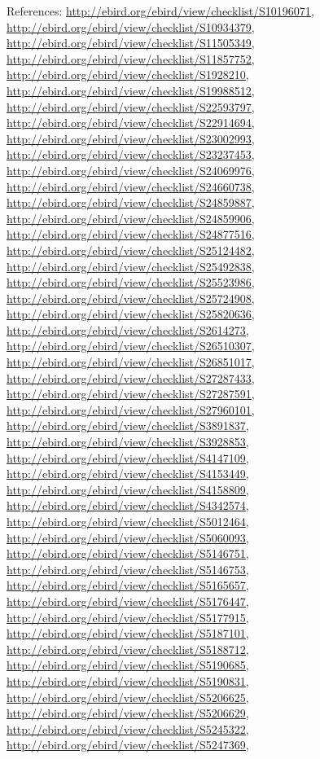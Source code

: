 \documentclass[9pt, article]{memoir}
\begin{document}
\begin{multicols}{2}
References: 
\url{http://ebird.org/ebird/view/checklist/S10196071}, 
\url{http://ebird.org/ebird/view/checklist/S10934379}, 
\url{http://ebird.org/ebird/view/checklist/S11505349}, 
\url{http://ebird.org/ebird/view/checklist/S11857752}, 
\url{http://ebird.org/ebird/view/checklist/S1928210}, 
\url{http://ebird.org/ebird/view/checklist/S19988512}, 
\url{http://ebird.org/ebird/view/checklist/S22593797}, 
\url{http://ebird.org/ebird/view/checklist/S22914694}, 
\url{http://ebird.org/ebird/view/checklist/S23002993}, 
\url{http://ebird.org/ebird/view/checklist/S23237453}, 
\url{http://ebird.org/ebird/view/checklist/S24069976}, 
\url{http://ebird.org/ebird/view/checklist/S24660738}, 
\url{http://ebird.org/ebird/view/checklist/S24859887}, 
\url{http://ebird.org/ebird/view/checklist/S24859906}, 
\url{http://ebird.org/ebird/view/checklist/S24877516}, 
\url{http://ebird.org/ebird/view/checklist/S25124482}, 
\url{http://ebird.org/ebird/view/checklist/S25492838}, 
\url{http://ebird.org/ebird/view/checklist/S25523986}, 
\url{http://ebird.org/ebird/view/checklist/S25724908}, 
\url{http://ebird.org/ebird/view/checklist/S25820636}, 
\url{http://ebird.org/ebird/view/checklist/S2614273}, 
\url{http://ebird.org/ebird/view/checklist/S26510307}, 
\url{http://ebird.org/ebird/view/checklist/S26851017}, 
\url{http://ebird.org/ebird/view/checklist/S27287433}, 
\url{http://ebird.org/ebird/view/checklist/S27287591}, 
\url{http://ebird.org/ebird/view/checklist/S27960101}, 
\url{http://ebird.org/ebird/view/checklist/S3891837}, 
\url{http://ebird.org/ebird/view/checklist/S3928853}, 
\url{http://ebird.org/ebird/view/checklist/S4147109}, 
\url{http://ebird.org/ebird/view/checklist/S4153449}, 
\url{http://ebird.org/ebird/view/checklist/S4158809}, 
\url{http://ebird.org/ebird/view/checklist/S4342574}, 
\url{http://ebird.org/ebird/view/checklist/S5012464}, 
\url{http://ebird.org/ebird/view/checklist/S5060093}, 
\url{http://ebird.org/ebird/view/checklist/S5146751}, 
\url{http://ebird.org/ebird/view/checklist/S5146753}, 
\url{http://ebird.org/ebird/view/checklist/S5165657}, 
\url{http://ebird.org/ebird/view/checklist/S5176447}, 
\url{http://ebird.org/ebird/view/checklist/S5177915}, 
\url{http://ebird.org/ebird/view/checklist/S5187101}, 
\url{http://ebird.org/ebird/view/checklist/S5188712}, 
\url{http://ebird.org/ebird/view/checklist/S5190685}, 
\url{http://ebird.org/ebird/view/checklist/S5190831}, 
\url{http://ebird.org/ebird/view/checklist/S5206625}, 
\url{http://ebird.org/ebird/view/checklist/S5206629}, 
\url{http://ebird.org/ebird/view/checklist/S5245322}, 
\url{http://ebird.org/ebird/view/checklist/S5247369}, 

\end{multicols}
\end{document}
